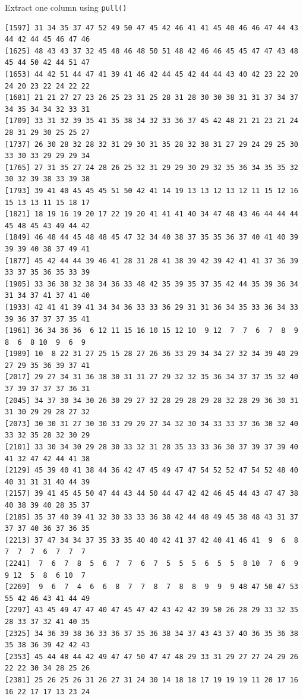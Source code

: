 \documentclass[
  ignorenonframetext,
  aspectratio=169,
]{beamer}
\let\oldtexttt\texttt
\renewcommand{\texttt}[1]{\colorbox{gray!20}{\oldtexttt{#1}}}
\begin{document}
\begin{frame}[fragile]{Extract one column using \texttt{pull()}}
\begin{verbatim}
[1597] 31 34 35 37 47 52 49 50 47 45 42 46 41 41 45 40 46 46 47 44 43 44 42 44 45 46 47 46
[1625] 48 43 43 37 32 45 48 46 48 50 51 48 42 46 46 45 45 47 47 43 48 45 44 50 42 44 51 47
[1653] 44 42 51 44 47 41 39 41 46 42 44 45 42 44 44 43 40 42 23 22 20 24 20 23 22 24 22 22
[1681] 21 21 27 27 23 26 25 23 31 25 28 31 28 30 30 38 31 31 37 34 37 34 35 34 34 32 33 31
[1709] 33 31 32 39 35 41 35 38 34 32 33 36 37 45 42 48 21 21 23 21 24 28 31 29 30 25 25 27
[1737] 26 30 28 32 28 32 31 29 30 31 35 28 32 38 31 27 29 24 29 25 30 33 30 33 29 29 29 34
[1765] 27 31 35 27 24 28 26 25 32 31 29 29 30 29 32 35 36 34 35 35 32 30 32 39 38 33 39 38
[1793] 39 41 40 45 45 45 51 50 42 41 14 19 13 13 12 13 12 11 15 12 16 15 13 13 11 15 18 17
[1821] 18 19 16 19 20 17 22 19 20 41 41 41 40 34 47 48 43 46 44 44 44 45 48 45 43 49 44 42
[1849] 46 48 44 45 48 48 45 47 32 34 40 38 37 35 35 36 37 40 41 40 39 39 39 40 38 37 49 41
[1877] 45 42 44 44 39 46 41 28 31 28 41 38 39 42 39 42 41 41 37 36 39 33 37 35 36 35 33 39
[1905] 33 36 38 32 38 34 36 33 48 42 35 39 35 37 35 42 44 35 39 36 34 31 34 37 41 37 41 40
[1933] 42 41 41 39 41 34 34 36 33 33 36 29 31 31 36 34 35 33 36 34 33 39 36 37 37 37 35 41
[1961] 36 34 36 36  6 12 11 15 16 10 15 12 10  9 12  7  7  6  7  8  9  8  6  8 10  9  6  9
[1989] 10  8 22 31 27 25 15 28 27 26 36 33 29 34 34 27 32 34 39 40 29 27 29 35 36 39 37 41
[2017] 29 27 34 31 36 38 30 31 31 27 29 32 32 35 36 34 37 37 35 32 40 37 39 37 37 37 36 31
[2045] 34 37 30 34 30 26 30 29 27 32 28 29 28 29 28 32 28 29 36 30 31 31 30 29 29 28 27 32
[2073] 30 30 31 27 30 30 33 29 29 27 34 32 30 34 33 33 37 36 30 32 40 33 32 35 28 32 30 29
[2101] 33 30 34 30 29 28 30 33 32 31 28 35 33 33 36 30 37 39 37 39 40 41 32 47 42 44 41 38
[2129] 45 39 40 41 38 44 36 42 47 45 49 47 47 54 52 52 47 54 52 48 40 40 31 31 31 40 44 39
[2157] 39 41 45 45 50 47 44 43 44 50 44 47 42 42 46 45 44 43 47 47 38 40 38 39 40 28 35 37
[2185] 35 37 40 39 41 32 30 33 33 36 38 42 44 48 49 45 38 48 43 31 37 37 37 40 36 37 36 35
[2213] 37 47 34 34 37 35 33 35 40 40 42 41 37 42 40 41 46 41  9  6  8  7  7  7  6  7  7  7
[2241]  7  6  7  8  5  6  7  7  6  7  5  5  5  6  5  5  8 10  7  6  9  9 12  5  8  6 10  7
[2269]  9  6  7  4  6  6  8  7  7  8  7  8  8  9  9  9 48 47 50 47 53 55 42 46 43 41 44 49
[2297] 43 45 49 47 47 40 47 45 47 42 43 42 42 39 50 26 28 29 33 32 35 28 33 37 32 41 40 35
[2325] 34 36 39 38 36 33 36 37 35 36 38 34 37 43 43 37 40 36 35 36 38 35 38 36 39 42 42 43
[2353] 45 44 48 44 42 49 47 47 50 47 47 48 29 33 31 29 27 27 24 29 26 22 22 30 34 28 25 26
[2381] 25 26 25 26 31 26 27 31 24 30 14 18 18 17 19 19 19 11 20 17 16 16 22 17 17 13 23 24

\end{verbatim}
\end{frame}
\end{document}
